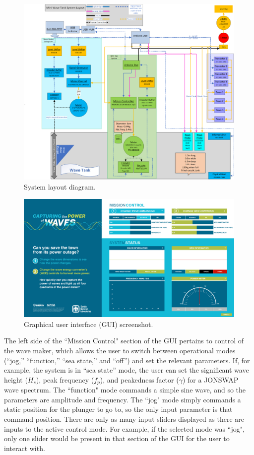 \documentclass[11pt, letterpaper]{article}
\begin{document}
\begin{figure}[tb]
  \centering
  \includegraphics[width=1\textwidth]{diagrams/SystemLayout.png}
  \caption{System layout diagram.}
  \label{fig:siweed_layout}
\end{figure}
\begin{figure}[tb]
  \centering
  \includegraphics[width=1\textwidth]{diagrams/siweed_guiScreenShot.png}
  \caption{Graphical user interface (GUI) screenshot.}
  \label{fig:siweed_guiScreenShot}
\end{figure}

The left side of the ``Mission Control" section of the GUI pertains to control of the wave maker, which allows the user to switch between operational modes (``jog,'' ``function,'' ``sea state,'' and ``off'') and set the relevant parameters.
If, for example, the system is in ``sea state'' mode, the user can set the significant wave height ($H_s$), peak frequency ($f_p$), and peakedness factor ($\gamma$) for a JONSWAP wave spectrum.
The ``function" mode commands a simple sine wave, and so the parameters are amplitude and frequency. 
The ``jog" mode simply commands a static position for the plunger to go to, so the only input parameter is that command position. 
There are only as many input sliders displayed as there are inputs to the active control mode. 
For example, if the selected mode was ``jog", only one slider would be present in that section of the GUI for the user to interact with.
\end{document}
